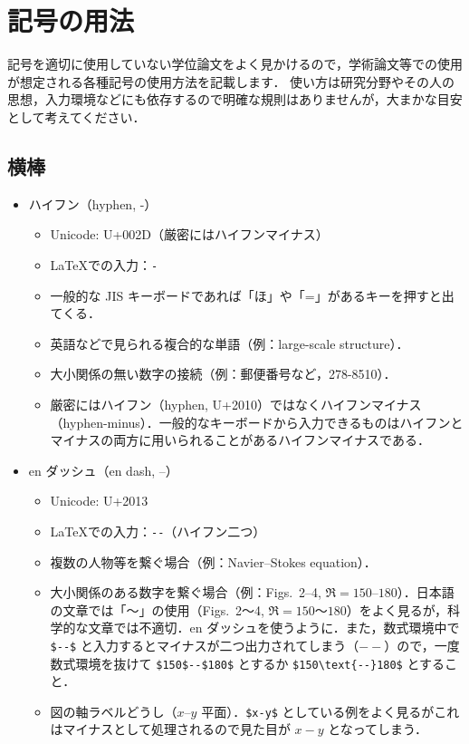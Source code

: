 \section{記号の用法}
\label{sec:mark}

記号を適切に使用していない学位論文をよく見かけるので，学術論文等での使用が想定される各種記号の使用方法を記載します．
使い方は研究分野やその人の思想，入力環境などにも依存するので明確な規則はありませんが，大まかな目安として考えてください．

\subsection*{横棒}

\begin{itemize}
    \item ハイフン（hyphen, -）
    \begin{itemize}
        \item Unicode: U+002D（厳密にはハイフンマイナス）
        \item \LaTeX での入力：\verb|-|
        \item 一般的な JIS キーボードであれば「ほ」や「=」があるキーを押すと出てくる．
        \item 英語などで見られる複合的な単語（例：large-scale structure）．
        \item 大小関係の無い数字の接続（例：郵便番号など，278-8510）．
        \item 厳密にはハイフン（hyphen, U+2010）ではなくハイフンマイナス（hyphen-minus）．一般的なキーボードから入力できるものはハイフンとマイナスの両方に用いられることがあるハイフンマイナスである．
    \end{itemize}
    \item en ダッシュ（en dash, --）
    \begin{itemize}
        \item Unicode: U+2013
        \item \LaTeX での入力：\verb|--|（ハイフン二つ）
        \item 複数の人物等を繋ぐ場合（例：Navier--Stokes equation）．
        \item 大小関係のある数字を繋ぐ場合（例：Figs.~2--4, $\Re = 150$--$180$）．日本語の文章では「～」の使用（Figs.~2～4, $\Re = 150$～$180$）をよく見るが，科学的な文章では不適切．en ダッシュを使うように．また，数式環境中で \verb|$--$| と入力するとマイナスが二つ出力されてしまう（$--$）ので，一度数式環境を抜けて \verb|$150$--$180$| とするか \verb|$150\text{--}180$| とすること．
        \item 図の軸ラベルどうし（$x$--$y$ 平面）．\verb|$x-y$| としている例をよく見るがこれはマイナスとして処理されるので見た目が $x-y$ となってしまう．

\end{itemize}
\end{itemize}

